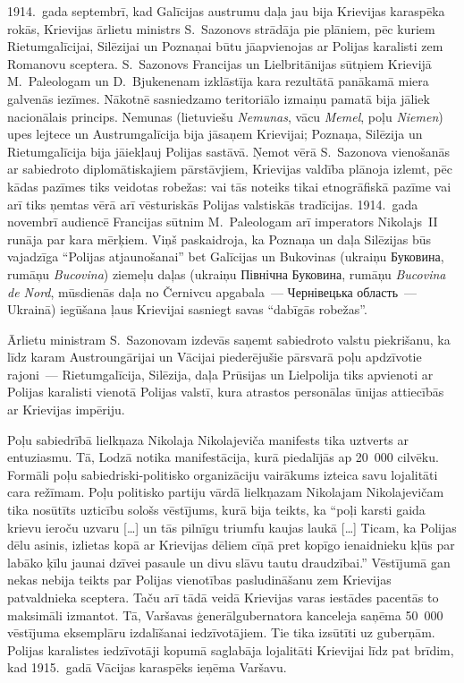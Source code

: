 \documentclass[twoside,a5paper,12pt,fleqn,openany]{extbook}
\newcommand{\pltxti}[1]{\textit{\textpolish{#1}}}
\newcommand{\detxti}[1]{\textit{\textgerman{#1}}}
\newcommand{\lttxti}[1]{\textit{\textlithuanian{#1}}}
\newcommand{\uktxti}[1]{\textukrainian{#1}}
\newcommand{\rotxti}[1]{\textit{\textromanian{#1}}}
\newcommand{\citespace}{[\dots{}]}
\begin{document}
1914.~gada septembrī, kad Galīcijas austrumu daļa jau bija Krievijas karaspēka rokās, Krievijas ārlietu ministrs S.~Sazonovs strādāja pie plāniem, pēc kuriem Rietumgalīcijai, Silēzijai un Poznaņai būtu jāapvienojas ar Polijas karalisti zem Romanovu sceptera. S.~Sazonovs Francijas un Lielbritānijas sūtņiem Krievijā M.~Paleologam un D.~Bjukenenam izklāstīja kara rezultātā panākamā miera galvenās iezīmes. Nākotnē sasniedzamo teritoriālo izmaiņu pamatā bija jāliek nacionālais princips. Nemunas (lietuviešu \lttxti{Nemunas}, vācu \detxti{Memel}, poļu \pltxti{Niemen}) upes lejtece un Austrumgalīcija bija jāsaņem Krievijai; Poznaņa, Silēzija un Rietumgalīcija bija jāiekļauj Polijas sastāvā. Ņemot vērā S.~Sazonova vienošanās ar sabiedroto diplomātiskajiem pārstāvjiem, Krievijas valdība plānoja izlemt, pēc kādas pazīmes tiks veidotas robežas: vai tās noteiks tikai etnogrāfiskā pazīme vai arī tiks ņemtas vērā arī vēsturiskās Polijas valstiskās tradīcijas. 1914.~gada novembrī audiencē Francijas sūtnim M.~Paleologam arī imperators Nikolajs~II runāja par kara mērķiem. Viņš paskaidroja, ka Poznaņa un daļa Silēzijas būs vajadzīga ``Polijas atjaunošanai'' bet Galīcijas un Bukovinas (ukraiņu \uktxti{Буковина}, rumāņu \rotxti{Bucovina}) ziemeļu daļas (ukraiņu \uktxti{Північна Буковина}, rumāņu \rotxti{Bucovina de Nord}, mūsdienās daļa no Černivcu apgabala~--- \uktxti{Чернівецька область}~--- Ukrainā) iegūšana ļaus Krievijai sasniegt savas ``dabīgās robežas''.

Ārlietu ministram S.~Sazonovam izdevās saņemt sabiedroto valstu piekrišanu, ka līdz karam Austroungārijai un Vācijai piederējušie pārsvarā poļu apdzīvotie rajoni~--- Rietumgalīcija, Silēzija, daļa Prūsijas un Lielpolija tiks apvienoti ar Polijas karalisti vienotā Polijas valstī, kura atrastos personālas ūnijas attiecībās ar Krievijas impēriju.

Poļu sabiedrībā lielkņaza Nikolaja Nikolajeviča manifests tika uztverts ar entuziasmu. Tā, Lodzā notika manifestācija, kurā piedalījās ap 20~000 cilvēku. Formāli poļu sabiedriski-politisko organizāciju vairākums izteica savu lojalitāti cara režīmam. Poļu politisko partiju vārdā lielkņazam Nikolajam Nikolajevičam tika nosūtīts uzticību sološs vēstījums, kurā bija teikts, ka ``poļi karsti gaida krievu ieroču uzvaru \citespace{} un tās pilnīgu triumfu kaujas laukā \citespace{} Ticam, ka Polijas dēlu asinis, izlietas kopā ar Krievijas dēliem cīņā pret kopīgo ienaidnieku kļūs par labāko ķīlu jaunai dzīvei pasaule un divu slāvu tautu draudzībai.'' Vēstījumā gan nekas nebija teikts par Polijas vienotības pasludināšanu zem Krievijas patvaldnieka sceptera. Taču arī tādā veidā Krievijas varas iestādes pacentās to maksimāli izmantot. Tā, Varšavas ģenerālgubernatora kanceleja saņēma 50~000 vēstījuma eksemplāru izdalīšanai iedzīvotājiem. Tie tika izsūtīti uz guberņām. Polijas karalistes iedzīvotāji kopumā saglabāja lojalitāti Krievijai līdz pat brīdim, kad 1915.~gadā Vācijas karaspēks ieņēma Varšavu.
\end{document}
